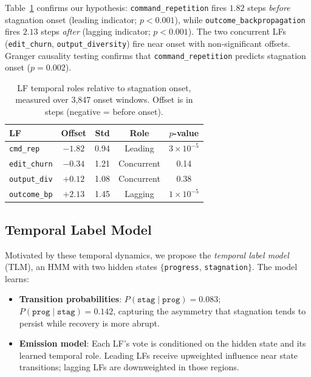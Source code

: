 \documentclass[11pt,a4paper]{article}
\newcommand{\tlm}{\textsc{TLM}}
\begin{document}
Table~\ref{tab:lf-temporal} confirms our hypothesis: \texttt{command\_repetition} fires $1.82$ steps \emph{before} stagnation onset (leading indicator; $p{<}0.001$), while \texttt{outcome\_backpropagation} fires $2.13$ steps \emph{after} (lagging indicator; $p{<}0.001$). The two concurrent LFs (\texttt{edit\_churn}, \texttt{output\_diversity}) fire near onset with non-significant offsets. Granger causality testing confirms that \texttt{command\_repetition} predicts stagnation onset ($p{=}0.002$).

\begin{table}[t]
\centering
\small
\begin{tabular}{lcccc}
\toprule
\textbf{LF} & \textbf{Offset} & \textbf{Std} & \textbf{Role} & \textbf{$p$-value} \\
\midrule
\texttt{cmd\_rep} & $-1.82$ & 0.94 & Leading & $3{\times}10^{-5}$ \\
\texttt{edit\_churn} & $-0.34$ & 1.21 & Concurrent & 0.14 \\
\texttt{output\_div} & $+0.12$ & 1.08 & Concurrent & 0.38 \\
\texttt{outcome\_bp} & $+2.13$ & 1.45 & Lagging & $1{\times}10^{-5}$ \\
\bottomrule
\end{tabular}
\caption{LF temporal roles relative to stagnation onset, measured over 3{,}847 onset windows. Offset is in steps (negative = before onset).}
\label{tab:lf-temporal}
\end{table}

\subsection{Temporal Label Model}
\label{sec:tlm}

Motivated by these temporal dynamics, we propose the \emph{temporal label model} (\tlm{}), an HMM with two hidden states $\{$\texttt{progress}, \texttt{stagnation}$\}$. The model learns:

\begin{itemize}[nosep,leftmargin=*]
\item \textbf{Transition probabilities}: $P(\texttt{stag} \mid \texttt{prog}) = 0.083$; $P(\texttt{prog} \mid \texttt{stag}) = 0.142$, capturing the asymmetry that stagnation tends to persist while recovery is more abrupt.
\item \textbf{Emission model}: Each LF's vote is conditioned on the hidden state and its learned temporal role. Leading LFs receive upweighted influence near state transitions; lagging LFs are downweighted in those regions.
\end{itemize}
\end{document}
